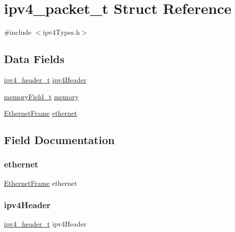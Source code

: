 \hypertarget{structipv4__packet__t}{}\section{ipv4\+\_\+packet\+\_\+t Struct Reference}
\label{structipv4__packet__t}


{\ttfamily \#include $<$ipv4\+Types.\+h$>$}

\subsection*{Data Fields}
\begin{DoxyCompactItemize}
\item 
\mbox{\hyperlink{structipv4__header__t}{ipv4\+\_\+header\+\_\+t}} \mbox{\hyperlink{structipv4__packet__t_a085146dbd62b99710f898b189350d50c}{ipv4\+Header}}
\item 
\mbox{\hyperlink{structmemory_field__t}{memory\+Field\+\_\+t}} \mbox{\hyperlink{structipv4__packet__t_ad8f3b87ff206655025f5734f21bce6e7}{memory}}
\item 
\mbox{\hyperlink{ethernet_types_8h_a4326bd21ae707ac8b03ec375370e3b5b}{Ethernet\+Frame}} \mbox{\hyperlink{structipv4__packet__t_aac5466b4a2ccecbe65f4a0b0d734ddb7}{ethernet}}
\end{DoxyCompactItemize}


\subsection{Field Documentation}
\mbox{\label{structipv4__packet__t_aac5466b4a2ccecbe65f4a0b0d734ddb7}} 
\subsubsection{\texorpdfstring{ethernet}{ethernet}}
{\footnotesize\ttfamily \mbox{\hyperlink{ethernet_types_8h_a4326bd21ae707ac8b03ec375370e3b5b}{Ethernet\+Frame}} ethernet}

\mbox{\label{structipv4__packet__t_a085146dbd62b99710f898b189350d50c}} 
\subsubsection{\texorpdfstring{ipv4Header}{ipv4Header}}
{\footnotesize\ttfamily \mbox{\hyperlink{structipv4__header__t}{ipv4\+\_\+header\+\_\+t}} ipv4\+Header}

